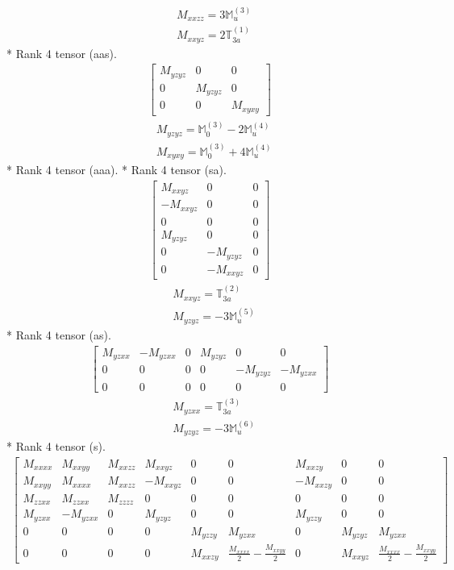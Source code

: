 \documentclass[fleqn,8pt,landscape]{jsarticle}
\begin{document}
\begin{align*}
& M_{xxzz} = 3 \mathbb{M}_{u}^{(3)} \\
& M_{xxyz} = 2 \mathbb{T}_{3a}^{(1)}
\end{align*}
* Rank 4 tensor (aas).
\begin{align*}
\begin{bmatrix} M_{yzyz} & 0 & 0 \\ 0 & M_{yzyz} & 0 \\ 0 & 0 & M_{xyxy} \end{bmatrix}
\end{align*}
\begin{align*}
& M_{yzyz} = \mathbb{M}_{0}^{(3)} - 2 \mathbb{M}_{u}^{(4)} \\
& M_{xyxy} = \mathbb{M}_{0}^{(3)} + 4 \mathbb{M}_{u}^{(4)}
\end{align*}
* Rank 4 tensor (aaa).
* Rank 4 tensor (sa).
\begin{align*}
\begin{bmatrix} M_{xxyz} & 0 & 0 \\ - M_{xxyz} & 0 & 0 \\ 0 & 0 & 0 \\ M_{yzyz} & 0 & 0 \\ 0 & - M_{yzyz} & 0 \\ 0 & - M_{xxyz} & 0 \end{bmatrix}
\end{align*}
\begin{align*}
& M_{xxyz} = \mathbb{T}_{3a}^{(2)} \\
& M_{yzyz} = - 3 \mathbb{M}_{u}^{(5)}
\end{align*}
* Rank 4 tensor (as).
\begin{align*}
\begin{bmatrix} M_{yzxx} & - M_{yzxx} & 0 & M_{yzyz} & 0 & 0 \\ 0 & 0 & 0 & 0 & - M_{yzyz} & - M_{yzxx} \\ 0 & 0 & 0 & 0 & 0 & 0 \end{bmatrix}
\end{align*}
\begin{align*}
& M_{yzxx} = \mathbb{T}_{3a}^{(3)} \\
& M_{yzyz} = - 3 \mathbb{M}_{u}^{(6)}
\end{align*}
* Rank 4 tensor (s).
\begin{align*}
\begin{bmatrix} M_{xxxx} & M_{xxyy} & M_{xxzz} & M_{xxyz} & 0 & 0 & M_{xxzy} & 0 & 0 \\ M_{xxyy} & M_{xxxx} & M_{xxzz} & - M_{xxyz} & 0 & 0 & - M_{xxzy} & 0 & 0 \\ M_{zzxx} & M_{zzxx} & M_{zzzz} & 0 & 0 & 0 & 0 & 0 & 0 \\ M_{yzxx} & - M_{yzxx} & 0 & M_{yzyz} & 0 & 0 & M_{yzzy} & 0 & 0 \\ 0 & 0 & 0 & 0 & M_{yzzy} & M_{yzxx} & 0 & M_{yzyz} & M_{yzxx} \\ 0 & 0 & 0 & 0 & M_{xxzy} & \frac{M_{xxxx}}{2} - \frac{M_{xxyy}}{2} & 0 & M_{xxyz} & \frac{M_{xxxx}}{2} - \frac{M_{xxyy}}{2} \end{bmatrix}
\end{align*}
\end{document}

